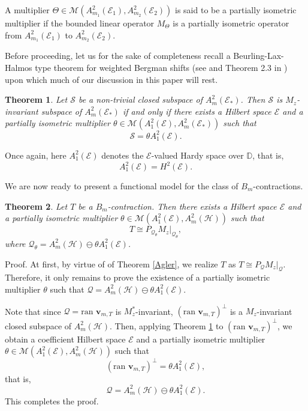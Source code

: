 \documentclass[12pt]{amsart}
\newtheorem{Theorem}{\sc Theorem}[section]
\begin{document}
{\noindent} A multiplier $\Theta \in {\mathcal{M}}(A^2_{m_1}({\mathcal{E}}_1),
A^2_{m_2}({\mathcal{E}}_2))$ is said to be a partially isometric multiplier
if the bounded linear operator $M_{\Theta}$ is a partially isometric
operator from $A^2_{m_1}({\mathcal{E}}_1)$ to $A^2_{m_2}({\mathcal{E}}_2)$.

Before proceeding, let us for the sake of completeness recall a
Beurling-Lax-Halmos type theorem for weighted Bergman shifts (see
\cite{BV1} and Theorem 2.3 in \cite{JS}) upon which much of our
discussion in this paper will rest.

\begin{Theorem}\label{MT-blh}
Let ${\mathcal{S}}$ be a non-trivial closed subspace of $A^2_m({\mathcal{E}}_*)$. Then
${\mathcal{S}}$ is $M_z$-invariant subspace of $A^2_m({\mathcal{E}}_*)$ if and only if
there exists a Hilbert space ${\mathcal{E}}$ and a partially isometric
multiplier $\theta \in {\mathcal{M}}(A^2_1({\mathcal{E}}), A^2_m({\mathcal{E}}_*))$ such that
\[{\mathcal{S}} = \theta A^2_1({\mathcal{E}}).\]
\end{Theorem}

Once again, here $A^2_1({\mathcal{E}})$ denotes the ${\mathcal{E}}$-valued Hardy space
over ${\mathbb{D}}$, that is, \[A^2_1({\mathcal{E}}) = H^2({\mathcal{E}}).\]

We are now ready to present a functional model for the class of
$B_m$-contractions.

\begin{Theorem}\label{model-1}
Let $T$ be a $B_m$-contraction. Then there exists a Hilbert space
${\mathcal{E}}$ and a partially isometric multiplier $\theta \in
{\mathcal{M}}(A^2_1({\mathcal{E}}), A^2_m({\mathcal{H}}))$ such that \[T \cong
P_{{\mathcal{Q}}_{\theta}} M_z|_{{\mathcal{Q}}_{\theta}},\]where ${\mathcal{Q}}_{\theta} =
A^2_m({\mathcal{H}}) \ominus \theta A^2_1({\mathcal{E}})$.
\end{Theorem}
{\noindent}\textsf{Proof.} At first, by virtue of of Theorem \ref{Agler}, we
realize $T$ as $T \cong P_{\mathcal{Q}} M_z|_{\mathcal{Q}}$. Therefore, it only
remains to prove the existence of a partially isometric multiplier
$\theta$ such that ${\mathcal{Q}} = A^2_m({\mathcal{H}}) \ominus \theta A^2_1({\mathcal{E}})$.

{\noindent} Note that since ${\mathcal{Q}} = \mbox{ran~}{\bm{v}}_{m,T}$ is
$M_z^*$-invariant, $(\mbox{ran~}{\bm{v}}_{m,T})^{\perp}$ is a
$M_z$-invariant closed subspace of $A^2_m({\mathcal{H}})$. Then, applying
Theorem \ref{MT-blh} to $(\mbox{ran~}{\bm{v}}_{m,T})^{\perp}$, we obtain
a coefficient Hilbert space ${\mathcal{E}}$ and a partially isometric
multiplier $\theta \in {\mathcal{M}}(A^2_1({\mathcal{E}}), A^2_m({\mathcal{H}}))$ such that
\[(\mbox{ran~}{\bm{v}}_{m,T})^{\perp} = \theta A^2_1({\mathcal{E}}),\]that is,
\[{\mathcal{Q}} = A^2_m({\mathcal{H}}) \ominus \theta A^2_1({\mathcal{E}}).\] This completes
the proof. {\hfill \vrule height6pt width 6pt depth 0pt}
\end{document}
